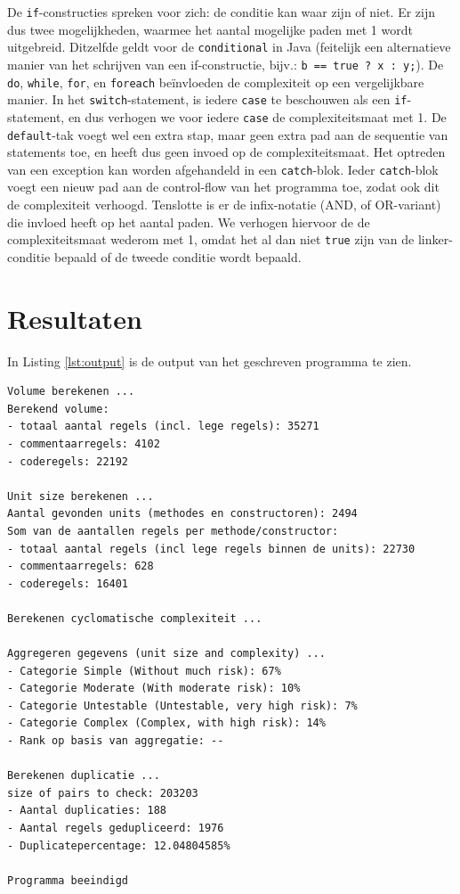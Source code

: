 \documentclass[a4paper]{article}
\begin{document}
De \texttt{if}-constructies spreken voor zich: de conditie kan
waar zijn of niet. Er zijn dus twee mogelijkheden, waarmee het
aantal mogelijke paden met 1 wordt uitgebreid. Ditzelfde geldt
voor de \texttt{conditional} in Java (feitelijk een alternatieve
manier van het schrijven van een if-constructie, bijv.:
\texttt{b == true ? x : y;}). De \texttt{do}, \texttt{while},
\texttt{for}, en \texttt{foreach} be\"invloeden de complexiteit
op een vergelijkbare manier. In het \texttt{switch}-statement,
is iedere \texttt{case} te beschouwen als een
\texttt{if}-statement, en dus verhogen we voor iedere
\texttt{case} de complexiteitsmaat met 1.
De \texttt{default}-tak voegt wel een extra stap, maar geen
extra pad aan de sequentie van statements toe, en heeft dus geen
invoed op de complexiteitsmaat.
Het optreden van een exception kan worden afgehandeld in een
\texttt{catch}-blok. Ieder \texttt{catch}-blok voegt een nieuw
pad aan de control-flow van het programma toe, zodat ook dit de
complexiteit verhoogd.
Tenslotte is er de infix-notatie (AND, of OR-variant) die
invloed heeft op het aantal paden. We verhogen hiervoor de de
complexiteitsmaat wederom met 1, omdat het al dan niet
\texttt{true} zijn van de linker-conditie bepaald of de tweede
conditie wordt bepaald.



\section{Resultaten}
In Listing \ref{lst:output} is de output van het geschreven programma te zien. 

\begin{lstlisting}[caption={Programma output},label={lst:output},frame = single]
Volume berekenen ...
Berekend volume: 
- totaal aantal regels (incl. lege regels): 35271
- commentaarregels: 4102
- coderegels: 22192

Unit size berekenen ...
Aantal gevonden units (methodes en constructoren): 2494
Som van de aantallen regels per methode/constructor:
- totaal aantal regels (incl lege regels binnen de units): 22730
- commentaarregels: 628
- coderegels: 16401

Berekenen cyclomatische complexiteit ...

Aggregeren gegevens (unit size and complexity) ...
- Categorie Simple (Without much risk): 67%
- Categorie Moderate (With moderate risk): 10%
- Categorie Untestable (Untestable, very high risk): 7%
- Categorie Complex (Complex, with high risk): 14%
- Rank op basis van aggregatie: --

Berekenen duplicatie ...
size of pairs to check: 203203
- Aantal duplicaties: 188
- Aantal regels gedupliceerd: 1976
- Duplicatepercentage: 12.04804585%

Programma beeindigd
\end{lstlisting}
 
\end{document}
